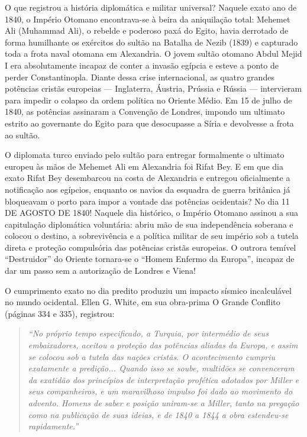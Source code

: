 \documentclass[11pt,a4paper,openany]{book}
\begin{document}
O que registrou a história diplomática e militar universal?
Naquele exato ano de 1840, o Império Otomano encontrava-se à beira da aniquilação total: Mehemet Ali (Muhammad Ali), o rebelde e poderoso paxá do Egito, havia derrotado de forma humilhante os exércitos do sultão na Batalha de Nezib (1839) e capturado toda a frota naval otomana em Alexandria. O jovem sultão otomano Abdul Mejid I era absolutamente incapaz de conter a invasão egípcia e esteve a ponto de perder Constantinopla.
Diante dessa crise internacional, as quatro grandes potências cristãs europeias — Inglaterra, Áustria, Prússia e Rússia — intervieram para impedir o colapso da ordem política no Oriente Médio. Em 15 de julho de 1840, as potências assinaram a Convenção de Londres, impondo um ultimato estrito ao governante do Egito para que desocupasse a Síria e devolvesse a frota ao sultão.

O diplomata turco enviado pelo sultão para entregar formalmente o ultimato europeu às mãos de Mehemet Ali em Alexandria foi Rifat Bey. E em que dia exato Rifat Bey desembarcou na costa de Alexandria e entregou oficialmente a notificação aos egípcios, enquanto os navios da esquadra de guerra britânica já bloqueavam o porto para impor a vontade das potências ocidentais?
No dia 11 DE AGOSTO DE 1840!
Naquele dia histórico, o Império Otomano assinou a sua capitulação diplomática voluntária: abriu mão de sua independência soberana e colocou o destino, a sobrevivência e a política militar de seu império sob a tutela direta e proteção compulsória das potências cristãs europeias. O outrora temível ``Destruidor'' do Oriente tornara-se o ``Homem Enfermo da Europa'', incapaz de dar um passo sem a autorização de Londres e Viena!

O cumprimento exato no dia predito produziu um impacto sísmico incalculável no mundo ocidental. Ellen G. White, em sua obra-prima O Grande Conflito (páginas 334 e 335), registrou:

\begin{quote}
\itshape ``No próprio tempo especificado, a Turquia, por intermédio de seus embaixadores, aceitou a proteção das potências aliadas da Europa, e assim se colocou sob a tutela das nações cristãs. O acontecimento cumpriu exatamente a predição... Quando isso se soube, multidões se convenceram da exatidão dos princípios de interpretação profética adotados por Miller e seus companheiros, e um maravilhoso impulso foi dado ao movimento do advento. Homens de saber e posição uniram-se a Miller, tanto na pregação como na publicação de suas ideias, e de 1840 a 1844 a obra estendeu-se rapidamente.''
\end{quote}
\end{document}
